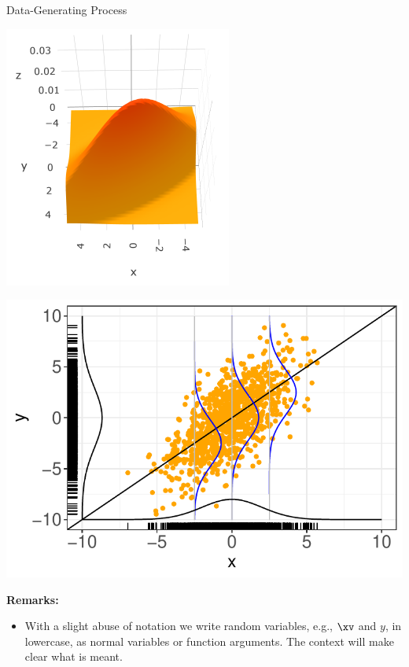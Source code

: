 \begin{vbframe}{Data-Generating Process}
\begin{minipage}{0.5\textwidth}
  \centering
  \includegraphics[width = 0.7\linewidth]{figure/sample-dgp-3d.png}
\end{minipage}%
\begin{minipage}{0.5\textwidth}
  \includegraphics[width = 0.9\linewidth]{figure/sample-dgp-2d.pdf}
\end{minipage}

\framebreak

\textbf{Remarks:}

\begin{itemize}

  \item With a slight abuse of notation we write random variables, e.g., $\xv$
  and $y$, in lowercase, as normal variables or function arguments. The context
  will make clear what is meant.


\end{itemize}
\end{vbframe}
